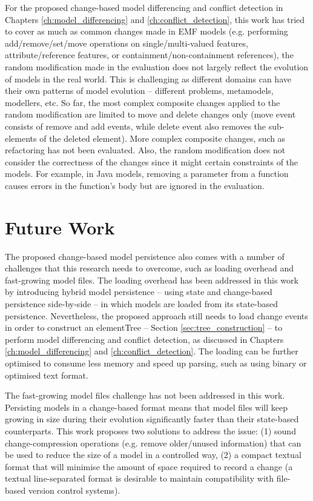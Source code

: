 For the proposed change-based model differencing and conflict detection in Chapters \ref{ch:model_differencing} and \ref{ch:conflict_detection}, this work has tried to cover as much as common changes made in EMF models (e.g. performing \textsf{add}/\textsf{remove}/\textsf{set}/\textsf{move} operations on \textsf{single}/\textsf{multi}-\textsf{valued} features, \textsf{attribute}/\textsf{reference} features, or \textsf{containment}/\textsf{non}-\textsf{containment} references), the random modification made in the evaluation does not largely reflect the evolution of models in the real world. This is challenging as different domains can have their own patterns of model evolution -- different problems, metamodels, modellers, etc. So far, the most complex composite changes applied to the random modification are limited to \textsf{move} and \textsf{delete} changes only (\textsf{move} event consists of \textsf{remove} and {add} events, while \textsf{delete} event also removes the sub-elements of the deleted element). More complex composite changes, such as refactoring has not been evaluated. Also, the random modification does not consider the correctness of the changes since it might certain constraints of the models. For example, in Java \cite{eclipse2018modiscojava} models, removing a parameter from a function causes errors in the function's body but are ignored in the evaluation.  

\section{Future Work}
\label{future_work}
The proposed change-based model persistence also comes with a number of challenges that this research needs to overcome, such as loading overhead and fast-growing model files. The loading overhead has been addressed in this work by introducing hybrid model persistence -- using state and change-based persistence side-by-side -- in which models are loaded from its state-based persistence. Nevertheless, the proposed approach still needs to load change events in order to construct an \textsf{elementTree} -- Section \ref{sec:tree_construction} -- to perform model differencing and conflict detection, as discussed in Chapters \ref{ch:model_differencing} and \ref{ch:conflict_detection}. The loading can be further optimised to consume less memory and speed up parsing, such as using binary or optimised text format.

The fast-growing model files challenge has not been addressed in this work. Persisting models in a change-based format means that model files will keep growing in size during their evolution significantly faster than their state-based counterparts. This work proposes two solutions to address the issue: (1) sound change-compression operations (e.g. remove older/unused information) that can be used to reduce the size of a model in a controlled way, (2) a compact textual format that will minimise the amount of space required to record a change (a textual line-separated format is desirable to maintain compatibility with file-based version control systems). 

